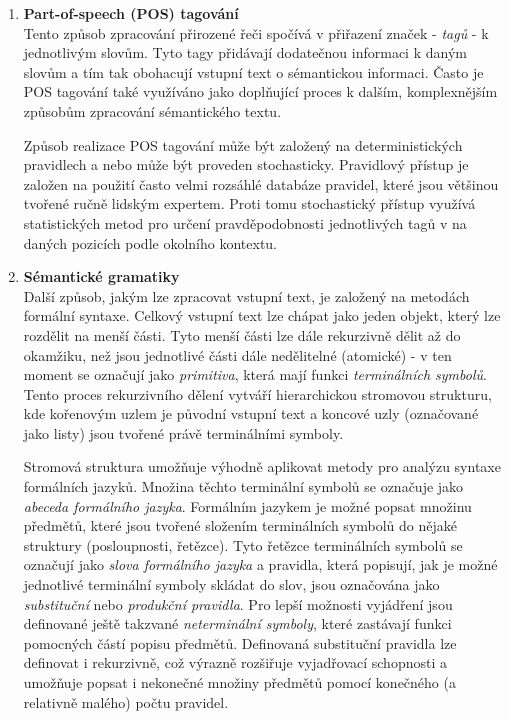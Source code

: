 \begin{enumerate}
	\item \textbf{Part-of-speech (POS) tagování}\\
	      Tento způsob zpracování přirozené řeči spočívá v přiřazení značek - \emph{tagů} - k jednotlivým slovům.
	      Tyto tagy přidávají dodatečnou informaci k daným slovům a tím tak obohacují vstupní text o sémantickou informaci.
	      Často je POS tagování také využíváno jako doplňující proces k dalším, komplexnějším způsobům zpracování sémantického textu.~\cite{the_conversational_interface}

	      Způsob realizace POS tagování může být založený na deterministických pravidlech a nebo může být proveden stochasticky.
	      Pravidlový přístup je založen na použití často velmi rozsáhlé databáze pravidel, které jsou většinou tvořené ručně lidským expertem.
	      Proti tomu stochastický přístup využívá statistických metod pro určení pravděpodobnosti jednotlivých tagů v na daných pozicích
	      podle okolního kontextu.~\cite{the_conversational_interface}

	      \newpage
	\item \textbf{Sémantické gramatiky}\\
	      Další způsob, jakým lze zpracovat vstupní text, je založený na metodách formální syntaxe.
	      Celkový vstupní text lze chápat jako jeden objekt, který lze rozdělit na menší části.
	      Tyto menší části lze dále rekurzivně dělit až do okamžiku, než jsou jednotlivé části dále nedělitelné (atomické) - v ten moment se označují jako \emph{primitiva},
	      která mají funkci \emph{terminálních symbolů}.
	      Tento proces rekurzivního dělení vytváří hierarchickou stromovou strukturu, kde kořenovým uzlem je původní vstupní text a
	      koncové uzly (označované jako listy) jsou tvořené právě terminálními symboly.~\cite{PsutkaJ_2006_Mluvimes}

	      Stromová struktura umožňuje výhodně aplikovat metody pro analýzu syntaxe formálních jazyků.
	      Množina těchto terminální symbolů se označuje jako \emph{abeceda formálního jazyka}.
	      Formálním jazykem je možné popsat množinu předmětů, které jsou tvořené složením terminálních symbolů do nějaké struktury (posloupnosti, řetězce).
	      Tyto řetězce terminálních symbolů se označují jako \emph{slova formálního jazyka} a pravidla,
	      která popisují, jak je možné jednotlivé terminální symboly skládat do slov, jsou označována jako \emph{substituční} nebo \emph{produkční pravidla}.
	      Pro lepší možnosti vyjádření jsou definované ještě takzvané \emph{neterminální symboly}, které zastávají funkci pomocných částí popisu předmětů.
	      Definovaná substituční pravidla lze definovat i rekurzivně, což výrazně rozšiřuje vyjadřovací schopnosti a umožňuje popsat i nekonečné množiny předmětů
	      pomocí konečného (a relativně malého) počtu pravidel.~\cite{PsutkaJ_2006_Mluvimes}


\end{enumerate}
